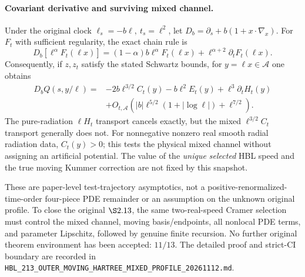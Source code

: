 \paragraph{Covariant derivative and surviving mixed channel.}
Under the original clock
\(\ell_s=-b\ell,\ t_s=\ell^2\), let
\(D_b=\partial_s+b(1+x\cdot\nabla_x)\). For
\(F_t\) with sufficient regularity, the exact chain rule is
\[
 D_b[\ell^\alpha F_t(\ell x)]
 =(1-\alpha)b\ell^\alpha F_t(\ell x)
   +\ell^{\alpha+2}\partial_tF_t(\ell x).
\]
Consequently, if \(z,z_t\) satisfy the stated Schwartz bounds,
for \(y=\ell x\in\mathcal A\) one obtains
\[
 \begin{aligned}
 D_bQ(s,y/\ell)={}&-2b\ell^{3/2}C_t(y)
       -b\ell^2E_t(y)+\ell^3\partial_tH_t(y)\\
 &+O_{t,\mathcal A}\left(
 |b|\ell^{5/2}(1+|\log\ell|)+\ell^{7/2}\right).
 \end{aligned}
\]
The pure-radiation \(\ell H_t\) transport cancels exactly,
but the mixed \(\ell^{3/2}C_t\) transport generally does not.
For nonnegative nonzero real smooth radial radiation data,
\(C_t(y)>0\); this tests the physical mixed channel without
assigning an artificial potential. The value of the \emph{unique
selected} HBL speed and the true moving Kummer correction are not
fixed by this snapshot.

These are paper-level test-trajectory asymptotics, not a
positive-renormalized-time-order four-piece PDE remainder or an
assumption on the unknown original profile. To close the original
\(\S2.13\), the same two-real-speed Cramer selection must control the
mixed channel, moving basis/endpoints, all nonlocal PDE terms, and
parameter Lipschitz, followed by genuine finite recursion.
No further original theorem environment has been accepted:
\(11/13\). The detailed proof and strict-CI boundary are recorded
in \texttt{HBL\_213\_OUTER\_MOVING\_HARTREE\_MIXED\_PROFILE\_20261112.md}.
